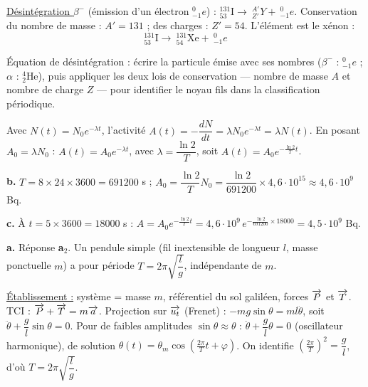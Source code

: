 \documentclass[11pt]{article}
\begin{document}
 \underline{Désintégration $\beta^-$} (émission d'un électron $^{0}_{-1}e$) : $^{131}_{53}\text{I} \longrightarrow\ ^{A'}_{Z'}Y +\ ^{0}_{-1}e$. Conservation du nombre de masse : $A' = 131$ ; des charges : $Z' = 54$. L'élément est le xénon :
\[ ^{131}_{53}\text{I} \longrightarrow\ ^{131}_{54}\text{Xe} +\ ^{0}_{-1}e \]

\begin{methode}
Équation de désintégration : écrire la particule émise avec ses
nombres ($\beta^-$ : $^{0}_{-1}e$ ; $\alpha$ : $^{4}_{2}\text{He}$),
puis appliquer les deux lois de conservation — nombre de masse $A$ et
nombre de charge $Z$ — pour identifier le noyau fils dans la
classification périodique.
\end{methode}

 Avec $N(t) = N_0 e^{-\lambda t}$, l'activité $A(t) = -\dfrac{dN}{dt} = \lambda N_0 e^{-\lambda t} = \lambda N(t)$. En posant $A_0 = \lambda N_0$ : $A(t) = A_0 e^{-\lambda t}$, avec $\lambda = \dfrac{\ln 2}{T}$, soit $A(t) = A_0 e^{-\frac{\ln 2}{T}t}$.

\textbf{b.} $T = 8\times 24\times 3600 = 691200$ s ; $A_0 = \dfrac{\ln 2}{T}N_0 = \dfrac{\ln 2}{691200}\times 4{,}6\cdot10^{15} \approx 4{,}6\cdot10^{9}$ Bq.

\textbf{c.} À $t = 5\times 3600 = 18000$ s : $A = A_0 e^{-\frac{\ln 2}{T}t} = 4{,}6\cdot10^{9}\,e^{-\frac{\ln 2}{691200}\times 18000} = 4{,}5\cdot10^{9}$ Bq.


\textbf{a. } Réponse \textbf{a$_2$}. Un pendule simple (fil inextensible de longueur $l$, masse ponctuelle $m$) a pour période $T = 2\pi\sqrt{\dfrac{l}{g}}$, indépendante de $m$.
\begin{center}
\end{center}
\underline{Établissement :} système = masse $m$, référentiel du sol galiléen, forces $\overrightarrow{P}$ et $\overrightarrow{T}$. TCI : $\overrightarrow{P} + \overrightarrow{T} = m\overrightarrow{a}$. Projection sur $\overrightarrow{u_t}$ (Frenet) : $-mg\sin\theta = ml\ddot{\theta}$, soit $\ddot{\theta} + \dfrac{g}{l}\sin\theta = 0$. Pour de faibles amplitudes $\sin\theta \approx \theta$ : $\ddot{\theta} + \dfrac{g}{l}\theta = 0$ (oscillateur harmonique), de solution $\theta(t) = \theta_m\cos\left(\frac{2\pi}{T}t + \varphi\right)$. On identifie $\left(\frac{2\pi}{T}\right)^2 = \dfrac{g}{l}$, d'où $T = 2\pi\sqrt{\dfrac{l}{g}}$.
\end{document}
